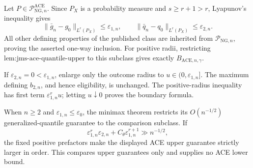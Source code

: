 Let \(P\in\mathcal P_{\mathrm{NG},n}^{\mathrm{ACE}}\).  Since \(P_X\) is a probability measure and \(s\ge r+1>r\), Lyapunov's inequality gives
\[
 \|\bar g_n-g_0\|_{L^r(P_X)}\le\varepsilon_{1,n},
 \qquad \|\bar q_n-q_0\|_{L^r(P_X)}\le\varepsilon_{2,n}.
\]
All other defining properties of the published class are inherited from \(\mathcal P_{\mathrm{NG},n}\), proving the asserted one-way inclusion.  For positive radii, restricting \(\text{lem:jms-ace-quantile-upper}\) to this subclass gives exactly \(B_{\mathrm{ACE},n,\gamma}\).

If \(\varepsilon_{2,n}=0<\varepsilon_{1,n}\), enlarge only the outcome radius to \(u\in(0,\varepsilon_{1,n}]\).  The maximum defining \(b_{2,n}\), and hence eligibility, is unchanged.  The positive-radius inequality has first term \(\varepsilon_{1,n}^ru\); letting \(u\downarrow0\) proves the boundary formula.

When \(n\ge2\) and \(\varepsilon_{1,n}\le\varepsilon_0\), the minimax theorem restricts its \(O(n^{-1/2})\) generalized-quantile guarantee to the comparison subclass.  If
\[
 \varepsilon_{1,n}^r\varepsilon_{2,n}+C_{\theta}\varepsilon_{1,n}^{r+1}\gg n^{-1/2},
\]
the fixed positive prefactors make the displayed ACE upper guarantee strictly larger in order.  This compares upper guarantees only and supplies no ACE lower bound.